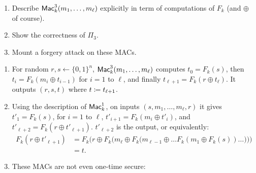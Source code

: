 \begin{enumerate}
	\item Describe $\operatorname{\mathsf{Mac}}_k^3(m_1,\ldots,m_\ell)$ explicitly in term of computations
	of $F_k$ (and $\oplus$ of course).
	\item Show the correctness of $\Pi_3$.
	\item Mount a forgery attack on these MACs.
\end{enumerate}

\begin{solution}
	\begin{enumerate}
		\item For random $r,s\leftarrow \{0,1\}^n$,
		$\operatorname{\mathsf{Mac}}^3_k(m_1,\ldots,m_\ell)$ computes $t_0=F_k(s)$, then $t_i=F_k(m_i \oplus t_{i-1})$ for $i=1$ to $\ell$, and finally
		$t_{\ell+1}=F_k(r\oplus t_\ell)$.
		It outputs $(r,s,t)$ where $t \coloneqq t_{\ell+1}$.

		\item Using the description of $\operatorname{\mathsf{Mac}}^1_k$, on inputs $(s,m_1,\ldots,m_\ell,r)$ it gives $t'_1=F_k(s)$, for $i=1$ to $\ell$, $t'_{i+1}=F_k(m_i \oplus t'_i)$, and $t'_{\ell+2}=F_k(r \oplus t'_{\ell+1})$. $t'_{\ell+2}$ is the output, or equivalently:
		\begin{align*}
		F_k(r \oplus t'_{\ell+1}) &= F_k \bigg(r \oplus F_k \Big(m_\ell \oplus F_k \big( m_{\ell-1} \oplus \dots F_k(m_1\oplus F_k(s)) \dots \big)\Big)\bigg)\\
		&=t.
		\end{align*}

		\item These MACs are not even one-time secure:
	\end{enumerate}
\end{solution}



